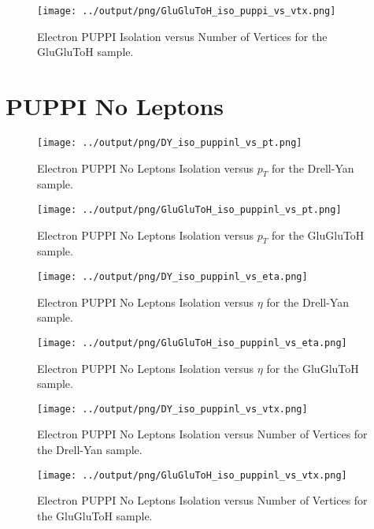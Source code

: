 \documentclass[11pt]{book}
\begin{document}
\begin{figure}[htb]
\centering
\texttt{[image: ../output/png/GluGluToH\_iso\_puppi\_vs\_vtx.png]}
\caption{Electron PUPPI Isolation versus Number of Vertices for the GluGluToH sample.}
\label{fig:ggh_iso_puppi_vs_vtx}
\end{figure}
\clearpage


\section{PUPPI No Leptons}

\begin{figure}[htb]
\centering
\texttt{[image: ../output/png/DY\_iso\_puppinl\_vs\_pt.png]}
\caption{Electron PUPPI No Leptons Isolation versus $p_{T}$ for the Drell-Yan sample.}
\label{fig:dy_iso_puppinl_vs_pt}
\end{figure}

\begin{figure}[htb]
\centering
\texttt{[image: ../output/png/GluGluToH\_iso\_puppinl\_vs\_pt.png]}
\caption{Electron PUPPI No Leptons Isolation versus $p_{T}$ for the GluGluToH sample.}
\label{fig:ggh_iso_puppinl_vs_pt}
\end{figure}

\begin{figure}[htb]
\centering
\texttt{[image: ../output/png/DY\_iso\_puppinl\_vs\_eta.png]}
\caption{Electron PUPPI No Leptons Isolation versus $\eta$ for the Drell-Yan sample.}
\label{fig:dy_iso_puppinl_vs_eta}
\end{figure}

\begin{figure}[htb]
\centering
\texttt{[image: ../output/png/GluGluToH\_iso\_puppinl\_vs\_eta.png]}
\caption{Electron PUPPI No Leptons Isolation versus $\eta$ for the GluGluToH sample.}
\label{fig:ggh_iso_puppinl_vs_eta}
\end{figure}

\begin{figure}[htb]
\centering
\texttt{[image: ../output/png/DY\_iso\_puppinl\_vs\_vtx.png]}
\caption{Electron PUPPI No Leptons Isolation versus Number of Vertices for the Drell-Yan sample.}
\label{fig:dy_iso_puppinl_vs_vtx}
\end{figure}

\begin{figure}[htb]
\centering
\texttt{[image: ../output/png/GluGluToH\_iso\_puppinl\_vs\_vtx.png]}
\caption{Electron PUPPI No Leptons Isolation versus Number of Vertices for the GluGluToH sample.}
\label{fig:ggh_iso_puppinl_vs_vtx}
\end{figure}
\clearpage
\end{document}
